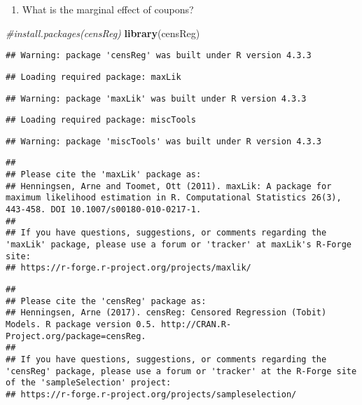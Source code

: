 \documentclass[
]{article}
\newenvironment{Shaded}{\begin{snugshade}}{\end{snugshade}}
\newcommand{\CommentTok}[1]{\textcolor[rgb]{0.56,0.35,0.01}{\textit{#1}}}
\newcommand{\FunctionTok}[1]{\textcolor[rgb]{0.13,0.29,0.53}{\textbf{#1}}}
\newcommand{\NormalTok}[1]{#1}
\providecommand{\tightlist}{%
  \setlength{\itemsep}{0pt}\setlength{\parskip}{0pt}}
\begin{document}
\begin{enumerate}
\def\labelenumi{\alph{enumi})}
\setcounter{enumi}{4}
\tightlist
\item
  What is the marginal effect of coupons?
\end{enumerate}

\begin{Shaded}
\begin{Highlighting}[]
\CommentTok{\#install.packages(\textquotesingle{}censReg\textquotesingle{})}
\FunctionTok{library}\NormalTok{(censReg)}
\end{Highlighting}
\end{Shaded}

\begin{verbatim}
## Warning: package 'censReg' was built under R version 4.3.3
\end{verbatim}

\begin{verbatim}
## Loading required package: maxLik
\end{verbatim}

\begin{verbatim}
## Warning: package 'maxLik' was built under R version 4.3.3
\end{verbatim}

\begin{verbatim}
## Loading required package: miscTools
\end{verbatim}

\begin{verbatim}
## Warning: package 'miscTools' was built under R version 4.3.3
\end{verbatim}

\begin{verbatim}
## 
## Please cite the 'maxLik' package as:
## Henningsen, Arne and Toomet, Ott (2011). maxLik: A package for maximum likelihood estimation in R. Computational Statistics 26(3), 443-458. DOI 10.1007/s00180-010-0217-1.
## 
## If you have questions, suggestions, or comments regarding the 'maxLik' package, please use a forum or 'tracker' at maxLik's R-Forge site:
## https://r-forge.r-project.org/projects/maxlik/
\end{verbatim}

\begin{verbatim}
## 
## Please cite the 'censReg' package as:
## Henningsen, Arne (2017). censReg: Censored Regression (Tobit) Models. R package version 0.5. http://CRAN.R-Project.org/package=censReg.
## 
## If you have questions, suggestions, or comments regarding the 'censReg' package, please use a forum or 'tracker' at the R-Forge site of the 'sampleSelection' project:
## https://r-forge.r-project.org/projects/sampleselection/
\end{verbatim}
\end{document}
